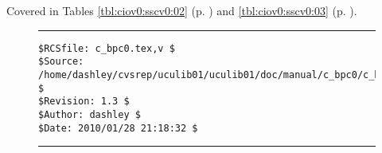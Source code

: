 Covered in 
Tables \ref{tbl:ciov0:sscv0:02} (p. \pageref{tbl:ciov0:sscv0:02})
and 
\ref{tbl:ciov0:sscv0:03} (p. \pageref{tbl:ciov0:sscv0:03}).


\noindent\begin{figure}[!b]
\noindent\rule[-0.25in]{\textwidth}{1pt}
\begin{tiny}
\begin{verbatim}
$RCSfile: c_bpc0.tex,v $
$Source: /home/dashley/cvsrep/uculib01/uculib01/doc/manual/c_bpc0/c_bpc0.tex,v $
$Revision: 1.3 $
$Author: dashley $
$Date: 2010/01/28 21:18:32 $
\end{verbatim}
\end{tiny}
\noindent\rule[0.25in]{\textwidth}{1pt}
\end{figure}

%
%

